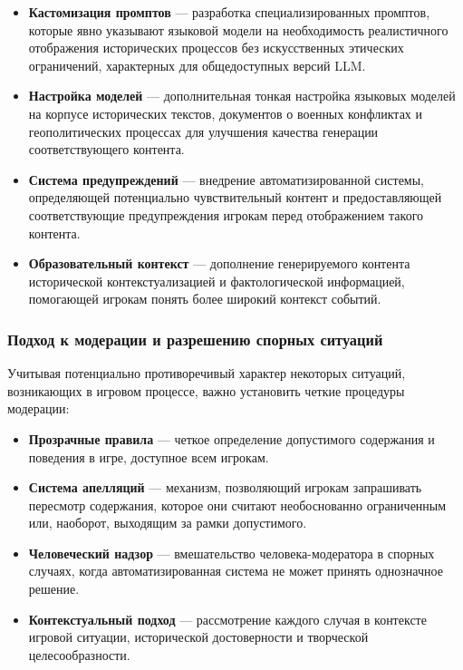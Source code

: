 \begin{itemize}
    \item \textbf{Кастомизация промптов} — разработка специализированных промптов, которые явно указывают языковой модели на необходимость реалистичного отображения исторических процессов без искусственных этических ограничений, характерных для общедоступных версий LLM.

    \item \textbf{Настройка моделей} — дополнительная тонкая настройка языковых моделей на корпусе исторических текстов, документов о военных конфликтах и геополитических процессах для улучшения качества генерации соответствующего контента.

    \item \textbf{Система предупреждений} — внедрение автоматизированной системы, определяющей потенциально чувствительный контент и предоставляющей соответствующие предупреждения игрокам перед отображением такого контента.

    \item \textbf{Образовательный контекст} — дополнение генерируемого контента исторической контекстуализацией и фактологической информацией, помогающей игрокам понять более широкий контекст событий.
\end{itemize}

\subsubsection{Подход к модерации и разрешению спорных ситуаций}

Учитывая потенциально противоречивый характер некоторых ситуаций, возникающих в игровом процессе, важно установить четкие процедуры модерации:

\begin{itemize}
    \item \textbf{Прозрачные правила} — четкое определение допустимого содержания и поведения в игре, доступное всем игрокам.

    \item \textbf{Система апелляций} — механизм, позволяющий игрокам запрашивать пересмотр содержания, которое они считают необоснованно ограниченным или, наоборот, выходящим за рамки допустимого.

    \item \textbf{Человеческий надзор} — вмешательство человека-модератора в спорных случаях, когда автоматизированная система не может принять однозначное решение.

    \item \textbf{Контекстуальный подход} — рассмотрение каждого случая в контексте игровой ситуации, исторической достоверности и творческой целесообразности.
\end{itemize}

